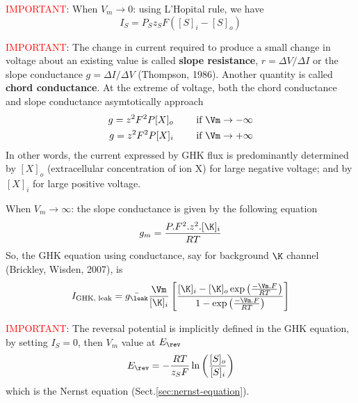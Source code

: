 \textcolor{red}{IMPORTANT}: When $V_m\rightarrow 0$: using L'Hopital rule, we
have
\begin{equation}
I_S = P_S z_S F ([S]_i - [S]_o)
\end{equation}

\textcolor{red}{IMPORTANT}: The change in current required to produce a small
change in voltage about an existing value is called {\bf slope resistance},
$r=\Delta V/\Delta I$ or the slope conductance $g=\Delta I/\Delta V$ (Thompson,
1986).  Another quantity is called {\bf chord conductance}. At the extreme of
voltage, both the chord conductance and slope conductance asymtotically approach
\begin{equation}
\begin{split}
g = z^2 F^2 P [X]_o  \qquad \text{ if } \Vm \rightarrow -\infty  \\
g = z^2 F^2 P [X]_i  \qquad \text{ if } \Vm \rightarrow +\infty  
\end{split} 
\end{equation}
In other words, the  current expressed by GHK flux is predominantly determined
by $[X]_o$ (extracellular concentration of ion X) for large negative voltage;
and by $[X]_i$ for large positive voltage.

When $V_m\rightarrow \infty$: the slope conductance
is given by the following equation
\begin{equation}
g_m = \frac{P.F^2.z^2. [\K]_i}{RT}
\end{equation}
So, the GHK equation using conductance, say for background $\K$ channel
(Brickley, Wisden, 2007), is
\begin{equation}
\label{sec:GHK-current-conductance}
I_{\text{GHK, leak}} = \bar{g_\leak} \frac{\Vm}{[\K]_i} \left[ \frac{[\K]_i -
[\K]_o \exp\left( \frac{-\Vm. F}{RT} \right)}{1 - \exp\left( \frac{-\Vm. F}{RT}
\right)} \right]
\end{equation}


\textcolor{red}{IMPORTANT}: The reversal potential is implicitly defined in the
GHK equation, by setting $I_S = 0$, then $V_m$ value at $E_\rev$
\begin{equation}
E_\rev	= -\frac{RT}{z_S F} \ln \left( \frac{[S]_o}{[S]_i}\right)
\end{equation}
which is the Nernst equation (Sect.\ref{sec:nernst-equation}).

